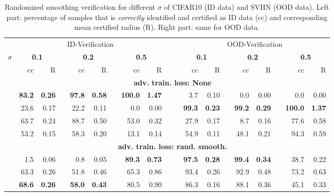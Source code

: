  \begin{table*}[ht!]
	\centering
	\caption{Randomized smoothing verification for different $\sigma$ of CIFAR10 (ID data) and SVHN (OOD data). Left part: percentage of samples that is \textit{correctly} identified and certified as ID data (cc) and corresponding mean certified radius (R). Right part: same for OOD data.}
	\begin{tiny}
		\begin{tabular}{@{}rrrcrrcrrc|crrcrrcrr@{}}
			\toprule
			& \multicolumn{8}{c}{ID-Verification} &  & &  \multicolumn{8}{c}{OOD-Verification} \\
			\cmidrule{2-10}  \cmidrule{12-19}
			$\sigma$ & \multicolumn{2}{c}{\textbf{0.1}} & & \multicolumn{2}{c}{\textbf{0.2}} & & \multicolumn{2}{c}{\textbf{0.5}} & & & 
			\multicolumn{2}{c}{\textbf{0.1}} & & \multicolumn{2}{c}{\textbf{0.2}} & & \multicolumn{2}{c}{\textbf{0.5}} \\ 
			\cmidrule{2-3}  \cmidrule{5-6} \cmidrule{8-9} 
			\cmidrule{12-13}  \cmidrule{15-16} \cmidrule{18-19}  
			& cc & R  & & cc & R  & & cc & R  & & & 
			cc & R  & & cc & R  & & cc & R   \\ 
			\midrule 
			& \multicolumn{18}{c}{\textbf{adv. train. loss: None}} \\ 
			\PriorNet  & \bf{83.2} & \bf{0.26} & & \bf{97.8} & \bf{0.58} & & \bf{100.0} & \bf{1.47}  & 
			& & 3.7 & 0.10 & & 0.0 & 0.00 & & 0.0 & 0.00 \\ 
			\PostNet  & 23.6 & 0.17 & & 22.2 & 0.11 & & 0.0 & 0.00  & 
			& & \bf{99.3} & \bf{0.23} & & \bf{99.2} & \bf{0.29} & & \bf{100.0} & \bf{1.37} \\ 
			\DDNet  & 63.7 & 0.24 & & 88.7 & 0.50 & & 53.0 & 0.32  & 
			& & 27.9 & 0.17 & & 8.7 & 0.16 & & 77.6 & 0.58 \\ 
			\EvNet  & 53.2 & 0.15 & & 58.3 & 0.20 & & 13.1 & 0.14  & 
			& & 54.9 & 0.11 & & 48.1 & 0.21 & & 94.3 & 0.59 \\ 
			\midrule 
			& \multicolumn{18}{c}{\textbf{adv. train. loss: rand. smooth.}} \\ 
			\PriorNet  & 1.5 & 0.06 & & 0.8 & 0.05 & & \bf{89.3} & \bf{0.73}  & 
			& & \bf{97.5} & \bf{0.28} & & \bf{99.4} & \bf{0.34} & & 38.7 & 0.22 \\ 
			\PostNet  & 63.3 & 0.26 & & 51.8 & 0.46 & & 65.3 & 0.86  & 
			& & 93.4 & 0.26 & & 92.9 & 0.48 & & 73.2 & 0.63 \\ 
			\DDNet  & \bf{68.6} & \bf{0.26} & & \bf{58.0} & \bf{0.43} & & 80.5 & 0.90  & 
			& & 86.3 & 0.16 & & 88.1 & 0.36 & & 45.1 & 0.33 \\ 

\end{tabular}
\end{tiny}
\end{table*}
